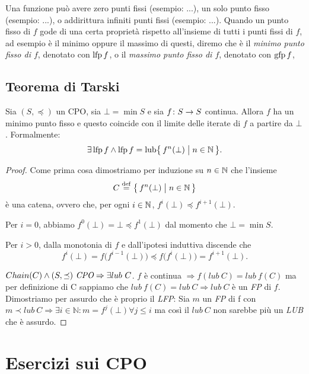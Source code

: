 Una funzione può avere zero punti fissi (esempio: ...), un solo punto fisso
(esempio: ...), o addirittura infiniti punti fissi (esempio: ...).
Quando un punto fisso di $f$ gode di una certa proprietà rispetto
all'insieme di tutti i punti fissi di $f$, ad esempio è il minimo
oppure il massimo di questi, diremo che è il
\emph{minimo punto fisso di $f$}, denotato con $\mathop{\mathrm{lfp}}\nolimits f$,
o il \emph{massimo punto fisso di $f$}, denotato con $\mathop{\mathrm{gfp}}\nolimits f$,

\subsection{Teorema di Tarski}
\begin{teorema}
Sia $(S, \preceq)$ un CPO, sia $\bot = \min S$ e sia
$\mathord{f}\colon S\to S$ continua.
Allora $f$ ha un minimo punto fisso e questo coincide con il limite
delle iterate di $f$ a partire da $\bot$.
Formalmente:
\[
  \exists \mathop{\mathrm{lfp}}\nolimits f
    \land
      \mathop{\mathrm{lfp}}\nolimits f = \mathop{\mathrm{lub}}\nolimits \bigl\{\, f^n(\bot) \bigm| n \in \mathbb{N} \,\bigr\}.
\]
  \begin{proof}
Come prima cosa dimostriamo per induzione su $n \in \mathbb{N}$
che l'insieme
\[
  C \defeq \bigl\{\, f^n(\bot) \bigm| n \in \Nset \,\bigr\}
\]
è una catena, ovvero che, per ogni $i \in \mathbb{N}$,
$f^i(\bot) \preceq f^{i+1}(\bot)$.

Per $i = 0$, abbiamo $f^0(\bot) = \bot \preceq f^1(\bot)$
dal momento che $\bot = \min S$.

Per $i > 0$, dalla monotonia di $f$ e dall'ipotesi induttiva discende che
\[
  f^i(\bot) = f\bigl(f^{i-1}(\bot)\bigr)
            \preceq f\bigl(f^i(\bot)\bigr)
            = f^{i+1}(\bot).
\]

$Chain(C) \land (S, \preceq)\ \emph{CPO} \Rightarrow \exists lub\ C$. $f$ è continua $\Rightarrow f(lub\ C) = lub\ f(C)$ ma per definizione di C sappiamo
    che $lub\ f(C) = lub\ C \Rightarrow lub\ C$ è un \emph{FP} di $f$. Dimostriamo per assurdo che è proprio il \emph{LFP}:
    Sia $m$ un \emph{FP} di f con $m \prec lub\ C \Rightarrow \exists i \in \mathbb{N} : m = f^j(\bot) \forall j \leq i$ ma così il $lub\ C$ non sarebbe più
    un \emph{LUB} che è assurdo.
  \end{proof}
\end{teorema}

\section{Esercizi sui CPO}

\theoremstyle{definizione}
\newtheorem{esercizio}{Esercizio}

